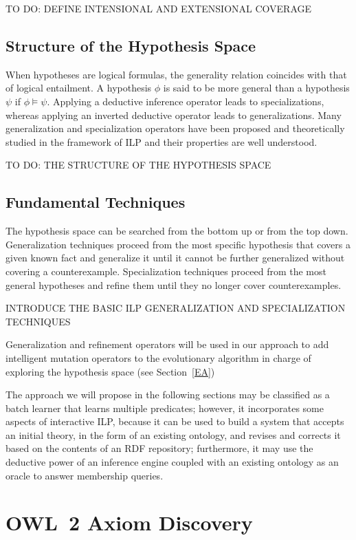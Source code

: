 \documentclass[a4paper]{article}
\newcounter{ex}
\begin{document}
TO DO: DEFINE INTENSIONAL AND EXTENSIONAL COVERAGE

\subsection{Structure of the Hypothesis Space}

When hypotheses are logical formulas, the generality relation coincides with that
of logical entailment. A hypothesis $\phi$ is said to be more general than a hypothesis $\psi$
if $\phi \models \psi$. Applying a deductive inference operator leads to specializations,
whereas applying an inverted deductive operator leads to generalizations.
Many generalization and specialization operators have been proposed and theoretically studied
in the framework of ILP and their properties are well understood.

TO DO: THE STRUCTURE OF THE HYPOTHESIS SPACE

\subsection{Fundamental Techniques}

The hypothesis space can be searched from the bottom up or from the top down.
Generalization techniques proceed from the most specific hypothesis that covers a
given known fact and generalize it until it cannot be further generalized without
covering a counterexample.
Specialization techniques proceed from the most general hypotheses and refine them
until they no longer cover counterexamples.

INTRODUCE THE BASIC ILP GENERALIZATION AND SPECIALIZATION TECHNIQUES

Generalization and refinement operators will be used in our approach to add intelligent
mutation operators to the evolutionary algorithm in charge of exploring the hypothesis
space (see Section~\ref{EA})

The approach we will propose in the following sections may be classified as a
batch learner that learns multiple predicates; however, it incorporates some aspects
of interactive ILP, because it can be used to build a system that accepts an initial theory,
in the form of an existing ontology, and revises and corrects it based on the contents
of an RDF repository; furthermore, it may use the deductive power of an inference engine
coupled with an existing ontology as an oracle to answer membership queries.

\section{OWL~2 Axiom Discovery}
\label{axiom-discovery}
\end{document}
